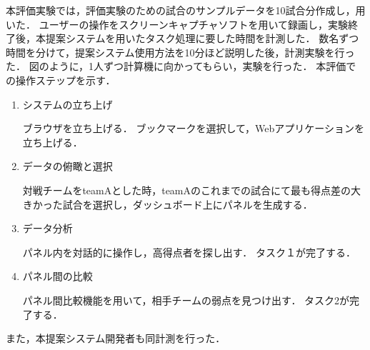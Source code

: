 \documentclass[sotsuron]{kuee}
\begin{document}
					本評価実験では，評価実験のための試合のサンプルデータを10試合分作成し，用いた．
					ユーザーの操作をスクリーンキャプチャソフトを用いて録画し，実験終了後，本提案システムを用いたタスク処理に要した時間を計測した．
					数名ずつ時間を分けて，提案システム使用方法を10分ほど説明した後，計測実験を行った．
					図のように，1人ずつ計算機に向かってもらい，実験を行った．
					本評価での操作ステップを示す．
					\begin{enumerate}
						\item システムの立ち上げ
						
						ブラウザを立ち上げる．
						ブックマークを選択して，Webアプリケーションを立ち上げる．
						\item データの俯瞰と選択
						
						対戦チームをteamAとした時，teamAのこれまでの試合にて最も得点差の大きかった試合を選択し，ダッシュボード上にパネルを生成する．
						\item データ分析
						
						パネル内を対話的に操作し，高得点者を探し出す．
						タスク１が完了する．
						\item パネル間の比較
						
						パネル間比較機能を用いて，相手チームの弱点を見つけ出す．
						タスク2が完了する．
					\end{enumerate}
					また，本提案システム開発者も同計測を行った．
\end{document}

